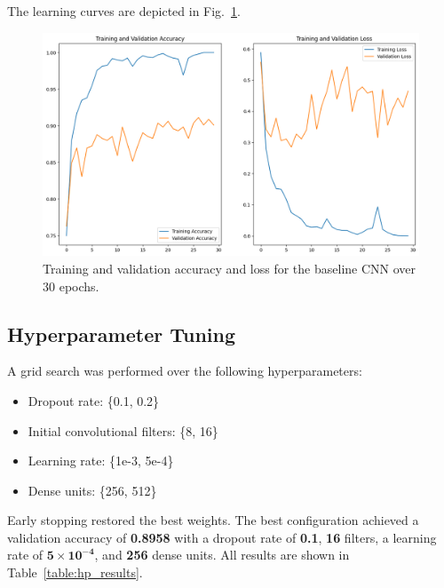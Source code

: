 \documentclass[conference]{IEEEtran}
\begin{document}
The learning curves are depicted in Fig.~\ref{fig:baseline_curves}.

\begin{figure}[htbp]
	\centerline{\includegraphics[width=\linewidth]{Images/baseline_curves.png}}
	\caption{Training and validation accuracy and loss for the baseline CNN over 30 epochs.}
	\label{fig:baseline_curves}
\end{figure}

\subsection{Hyperparameter Tuning}
A grid search was performed over the following hyperparameters:
\begin{itemize}
	\item Dropout rate: \{0.1, 0.2\}
	\item Initial convolutional filters: \{8, 16\}
	\item Learning rate: \{1e-3, 5e-4\}
	\item Dense units: \{256, 512\}
\end{itemize}

Early stopping restored the best weights. The best configuration achieved a validation accuracy of \textbf{0.8958} with a dropout rate of \textbf{0.1}, \textbf{16} filters, a learning rate of \(\mathbf{5\times10^{-4}}\), and \textbf{256} dense units. All results are shown in Table~\ref{table:hp_results}.
\end{document}
